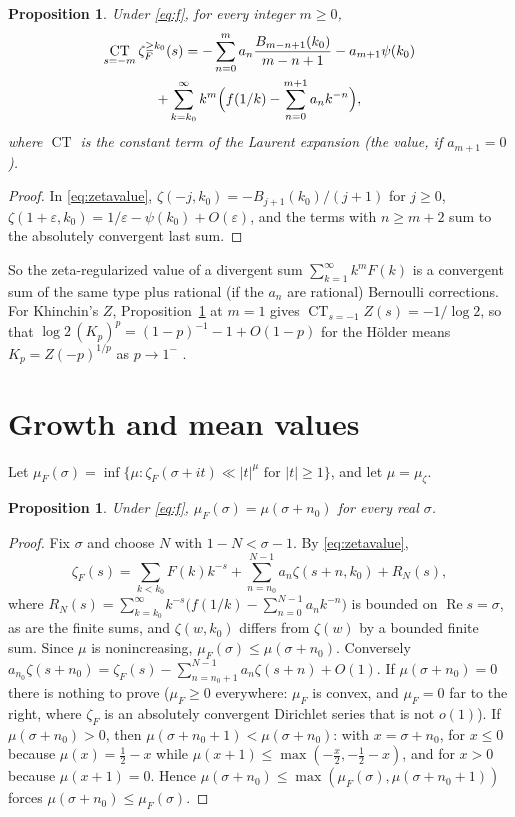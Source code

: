 \documentclass[11pt,reqno]{amsart}
\newtheorem{proposition}[theorem]{Proposition}
\theoremstyle{definition}
\theoremstyle{remark}
\newcommand{\CT}{\operatorname*{CT}}
\begin{document}
\begin{proposition}\label{prop:negative}
Under \eqref{eq:f}, for every integer $m \ge 0$,
\begin{multline*}
  \CT_{s=-m}\zeta_F^{\ge k_0}(s) = -\sum_{n=0}^{m}a_n\frac{B_{m-n+1}(k_0)}{m-n+1} - a_{m+1}\psi(k_0) \\
  + \sum_{k=k_0}^{\infty}k^m\Bigl(f(1/k) - \sum_{n=0}^{m+1}a_nk^{-n}\Bigr),
\end{multline*}
where $\CT$ is the constant term of the Laurent expansion (the value, if $a_{m+1} = 0$).
\end{proposition}

\begin{proof}
In \eqref{eq:zetavalue}, $\zeta(-j, k_0) = -B_{j+1}(k_0)/(j+1)$ for $j \ge 0$,
$\zeta(1+\varepsilon,k_0) = 1/\varepsilon - \psi(k_0) + O(\varepsilon)$, and the terms with $n \ge m+2$ sum to the
absolutely convergent last sum.
\end{proof}

So the zeta-regularized value of a divergent sum $\sum_{k=1}^{\infty} k^mF(k)$ is a convergent sum of the same type plus
rational (if the $a_n$ are rational) Bernoulli corrections. For Khinchin's $Z$, Proposition~\ref{prop:negative}
at $m = 1$ gives $\CT_{s=-1}Z(s) = -1/\log2$, so that $\log2\,(K_p)^p = (1-p)^{-1} - 1 + O(1-p)$ for the H\"older means $K_p = Z(-p)^{1/p}$ as $p \to 1^-$ \cite[Proposition~6.1]{Joh26}.

\section{Growth and mean values}
Let $\mu_F(\sigma) = \inf\{\mu : \zeta_F(\sigma+it) \ll |t|^\mu \text{ for } |t| \ge 1\}$, and let $\mu = \mu_\zeta$.

\begin{proposition}\label{prop:growth}
Under \eqref{eq:f}, $\mu_F(\sigma) = \mu(\sigma + n_0)$ for every real $\sigma$.
\end{proposition}

\begin{proof}
Fix $\sigma$ and choose $N$ with $1 - N < \sigma - 1$. By \eqref{eq:zetavalue},
\[
  \zeta_F(s) = \sum_{k<k_0}F(k)k^{-s} + \sum_{n=n_0}^{N-1}a_n\zeta(s+n,k_0) + R_N(s),
\]
where $R_N(s) = \sum_{k=k_0}^{\infty}k^{-s}\bigl(f(1/k) - \sum_{n=0}^{N-1}a_nk^{-n}\bigr)$ is bounded on
$\operatorname{Re}s = \sigma$, as are the finite sums, and $\zeta(w,k_0)$ differs from $\zeta(w)$ by a
bounded finite sum. Since $\mu$ is nonincreasing, $\mu_F(\sigma) \le \mu(\sigma+n_0)$. Conversely
$a_{n_0}\zeta(s+n_0) = \zeta_F(s) - \sum_{n=n_0+1}^{N-1}a_n\zeta(s+n) + O(1)$. If $\mu(\sigma+n_0) = 0$ there is nothing to
prove ($\mu_F \ge 0$ everywhere: $\mu_F$ is convex, and $\mu_F = 0$ far to the right, where $\zeta_F$ is an
absolutely convergent Dirichlet series that is not $o(1)$). If $\mu(\sigma+n_0) > 0$, then
$\mu(\sigma+n_0+1) < \mu(\sigma+n_0)$: with $x = \sigma+n_0$, for $x \le 0$ because $\mu(x) = \frac12 - x$ while
$\mu(x+1) \le \max(-\frac x2, -\frac12 - x)$, and for $x > 0$ because $\mu(x+1) = 0$. Hence
$\mu(\sigma+n_0) \le \max(\mu_F(\sigma), \mu(\sigma+n_0+1))$ forces $\mu(\sigma+n_0) \le \mu_F(\sigma)$.
\end{proof}
\end{document}
